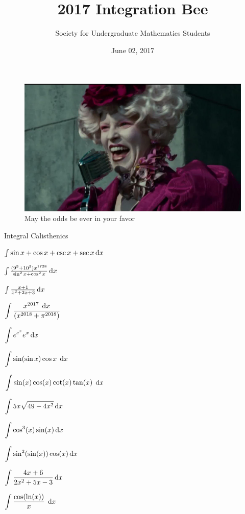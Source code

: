 \documentclass[11pt]{beamer}
\title{2017 Integration Bee}
\author{Society for Undergraduate Mathematics Students}
\date{June 02, 2017}
\newcommand{\dint}{\displaystyle \int}
\newcommand{\makeslide}[1]{
    \begin{frame}
    \Huge
    \begin{center}
    #1
    \end{center}
    \end{frame}
    \begin{frame}
    \end{frame}
}
\newcommand{\emptyslide}{
\begin{frame}\end{frame}
}
\begin{document}
\begin{frame}
  \titlepage
\end{frame}

\emptyslide

\begin{frame}
\begin{figure}
    \centering
    \includegraphics[width=\linewidth]{favor.jpg}
    \caption{May the odds be ever in your favor}
    \label{fig:my_label}
\end{figure}
\end{frame}

\emptyslide


\makeslide{Integral Calisthenics}

\makeslide{
$\int \sin x + \cos x + \csc x + \sec x \dif x$
}

\makeslide{
$\int \frac{(9^3 + 10^3)x^{1728}}{\sin^2 x + \cos^2 x} \dif x$
}

\makeslide{
$\int \frac{x+1}{x^2+2x+3}\dif x$
}

\makeslide{
$\dint{\dfrac{x^{2017} \; \dif x}{(x^{2018} + \pi^{2018})}} $
}

\makeslide{
$\dint{e^{e^x}e^x \dif x}$
}

\makeslide{
$\dint{\sin(\sin x)\cos x \; \dif x}$
}

\makeslide{
$\dint{\sin(x)\cos(x)\cot(x)\tan(x)\; \dif x}$
}

\makeslide{
$\dint{5x\sqrt{49 - 4x^2} \dif x}$
}

\makeslide{
$\dint{\cos^3(x)\sin(x) \dif x} $
}

\makeslide{
$\dint{\sin^2(\sin (x))\cos (x) \dif x}$
}

\makeslide{
$\dint{\dfrac{4x + 6}{2x^2 + 5x - 3} \dif x}$
}

\makeslide{
$\dint{\dfrac{\cos(\ln(x))}{x} \; \dif x} $
}
\end{document}
